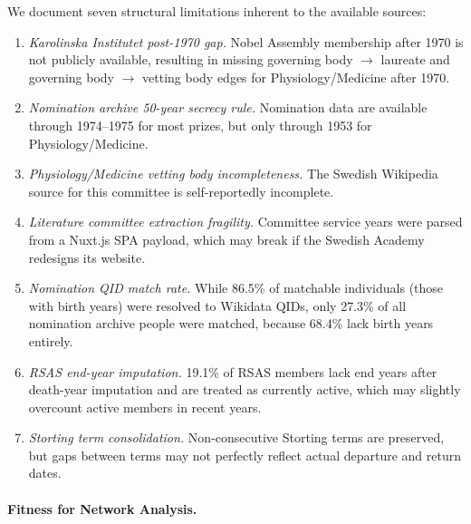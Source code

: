 \documentclass[12pt]{article}
\begin{document}
We document seven structural limitations inherent to the available sources:
\begin{enumerate}
    \item \emph{Karolinska Institutet post-1970 gap.} Nobel Assembly membership after 1970 is not publicly available, resulting in missing governing body $\to$ laureate and governing body $\to$ vetting body edges for Physiology/Medicine after 1970.

    \item \emph{Nomination archive 50-year secrecy rule.} Nomination data are available through 1974--1975 for most prizes, but only through 1953 for Physiology/Medicine.

    \item \emph{Physiology/Medicine vetting body incompleteness.} The Swedish Wikipedia source for this committee is self-reportedly incomplete.

    \item \emph{Literature committee extraction fragility.} Committee service years were parsed from a Nuxt.js SPA payload, which may break if the Swedish Academy redesigns its website.

    \item \emph{Nomination QID match rate.} While 86.5\% of matchable individuals (those with birth years) were resolved to Wikidata QIDs, only 27.3\% of all nomination archive people were matched, because 68.4\% lack birth years entirely.

    \item \emph{RSAS end-year imputation.} 19.1\% of RSAS members lack end years after death-year imputation and are treated as currently active, which may slightly overcount active members in recent years.

    \item \emph{Storting term consolidation.} Non-consecutive Storting terms are preserved, but gaps between terms may not perfectly reflect actual departure and return dates.
\end{enumerate}

\paragraph*{Fitness for Network Analysis.}
\end{document}
